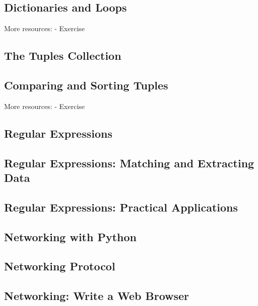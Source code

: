 \documentclass{article}%
\begin{document}
%
\subsection{Dictionaries and Loops}%
\label{subsec:DictionariesandLoops}%
More resources:\newline%
{-} Exercise\newline%

%
\subsection{The Tuples Collection}%
\label{subsec:TheTuplesCollection}%

%
\subsection{Comparing and Sorting Tuples}%
\label{subsec:ComparingandSortingTuples}%
More resources:\newline%
{-} Exercise\newline%

%
\subsection{Regular Expressions}%
\label{subsec:RegularExpressions}%

%
\subsection{Regular Expressions: Matching and Extracting Data}%
\label{subsec:RegularExpressionsMatchingandExtractingData}%

%
\subsection{Regular Expressions: Practical Applications}%
\label{subsec:RegularExpressionsPracticalApplications}%

%
\subsection{Networking with Python}%
\label{subsec:NetworkingwithPython}%

%
\subsection{Networking Protocol}%
\label{subsec:NetworkingProtocol}%

%
\subsection{Networking: Write a Web Browser}%
\label{subsec:NetworkingWriteaWebBrowser}%
\end{document}
